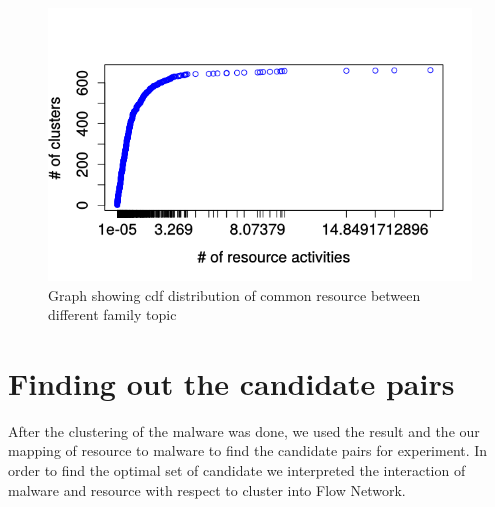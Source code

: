 \begin{figure}[htbp]
\begin{center}
  \includegraphics[scale=0.7]{figures/inter_clustered_common.png}
\end{center}
\captionsetup{font=small}
\caption{Graph showing cdf distribution of common resource between different family topic}
\label{fig:interclustcommon}
\end{figure}

\section{Finding out the candidate pairs}
\label{sec:Finding out the candidate pairs}
After the clustering of the malware was done, we used the result and the our mapping of resource to malware to find the candidate pairs for experiment.
In order to find the optimal set of candidate we interpreted the interaction of malware and resource with respect to cluster into Flow Network.
